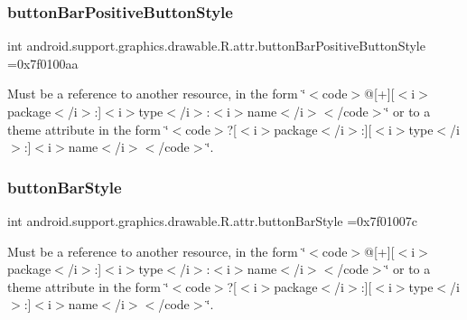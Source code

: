 \subsubsection{\texorpdfstring{button\+Bar\+Positive\+Button\+Style}{buttonBarPositiveButtonStyle}}
{\footnotesize\ttfamily int android.\+support.\+graphics.\+drawable.\+R.\+attr.\+button\+Bar\+Positive\+Button\+Style =0x7f0100aa\hspace{0.3cm}{\ttfamily [static]}}

Must be a reference to another resource, in the form \char`\"{}$<$code$>$@\mbox{[}+\mbox{]}\mbox{[}$<$i$>$package$<$/i$>$\+:\mbox{]}$<$i$>$type$<$/i$>$\+:$<$i$>$name$<$/i$>$$<$/code$>$\char`\"{} or to a theme attribute in the form \char`\"{}$<$code$>$?\mbox{[}$<$i$>$package$<$/i$>$\+:\mbox{]}\mbox{[}$<$i$>$type$<$/i$>$\+:\mbox{]}$<$i$>$name$<$/i$>$$<$/code$>$\char`\"{}. \mbox{\label{classandroid_1_1support_1_1graphics_1_1drawable_1_1R_1_1attr_a0b1e427b1ad8248141c2de369b55d96b}} 
\subsubsection{\texorpdfstring{button\+Bar\+Style}{buttonBarStyle}}
{\footnotesize\ttfamily int android.\+support.\+graphics.\+drawable.\+R.\+attr.\+button\+Bar\+Style =0x7f01007c\hspace{0.3cm}{\ttfamily [static]}}

Must be a reference to another resource, in the form \char`\"{}$<$code$>$@\mbox{[}+\mbox{]}\mbox{[}$<$i$>$package$<$/i$>$\+:\mbox{]}$<$i$>$type$<$/i$>$\+:$<$i$>$name$<$/i$>$$<$/code$>$\char`\"{} or to a theme attribute in the form \char`\"{}$<$code$>$?\mbox{[}$<$i$>$package$<$/i$>$\+:\mbox{]}\mbox{[}$<$i$>$type$<$/i$>$\+:\mbox{]}$<$i$>$name$<$/i$>$$<$/code$>$\char`\"{}. \mbox{\label{classandroid_1_1support_1_1graphics_1_1drawable_1_1R_1_1attr_a889359a9efee0aca0f013715032919fd}} 
